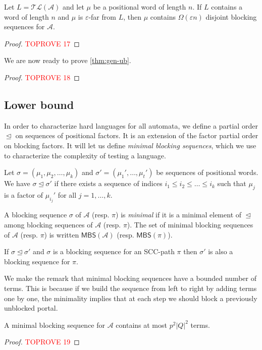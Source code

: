 \documentclass[letterpaper, USenglish, cleveref, autoref, thm-restate, numberwithinsect]{lipics-v2021}
\theoremstyle{theorem}
\theoremstyle{definition}
\newcommand{\Aa}{\mathcal{A}}
\newcommand{\eps}{\varepsilon}
\newcommand{\MBS}{\textsf{MBS}\xspace}
\newcommand{\pobs}{\trianglelefteq}
\newcommand{\SCCpath}{\pi}
\newcommand{\timedlang}[1]{\mathcal{TL}( #1 )}
\begin{document}
\begin{corollary}\label{cor:far-L-many-bs}
	Let $L = \timedlang{\Aa}$ and let $\mu$ be a positional word of length $n$.
	If $L$ contains a word of length $n$ and $\mu$ is $\eps$-far from $L$,
	then $\mu$ contains $\Omega(\eps n)$ disjoint blocking sequences for $\Aa$.
\end{corollary}
\begin{proof}\textcolor{red}{TOPROVE 17}\end{proof}

We are now ready to prove \cref{thm:gen-ub}.
\begin{proof}\textcolor{red}{TOPROVE 18}\end{proof}



\subsection{Lower bound}

In order to characterize hard languages for all automata, we define a partial order $\pobs$ on sequences of positional factors.
It is an extension of the factor partial order on blocking factors. 
It will let us define \emph{minimal blocking sequences}, which we use to characterize the complexity of testing a language. 

\begin{definition}\label{def:MBS}
	Let $\sigma = (\mu_1, \mu_2, \ldots, \mu_k)$ and $\sigma' =  (\mu_1',\ldots, \mu_{t}')$ be sequences of positional words.
	We have $\sigma \pobs \sigma'$ if there exists a sequence of indices $i_1 \leq i_2 \leq \ldots \leq i_k$ such that $\mu_{j}$ is a factor of $\mu_{i_j}'$ for all $j = 1,\ldots, k$.
	
	A blocking sequence $\sigma$ of $\Aa$ (resp. $\SCCpath$) is \emph{minimal} if it is a minimal element of $\pobs$ among blocking sequences of $\Aa$ (resp. $\SCCpath$). The set of minimal blocking sequences of $\Aa$ (resp. $\SCCpath$) is written $\MBS(\Aa)$ (resp. $\MBS(\SCCpath)$).
\end{definition}

\begin{remark}
	If $\sigma \pobs \sigma'$ and $\sigma$ is a blocking sequence for an SCC-path $\pi$ then $\sigma'$ is also a blocking sequence for $\pi$.
\end{remark}

We make the remark that minimal blocking sequences have a bounded number of terms. This is because if we build the sequence from left to right by adding terms one by one, the minimality implies that at each step we should block a previously unblocked portal.
\begin{lemma}
    \label{lem:bound-length-min-blocking}
    A minimal blocking sequence for $\Aa$ contains at most $p^2|Q|^2$ terms.
\end{lemma}
\begin{proof}\textcolor{red}{TOPROVE 19}\end{proof}
\end{document}
